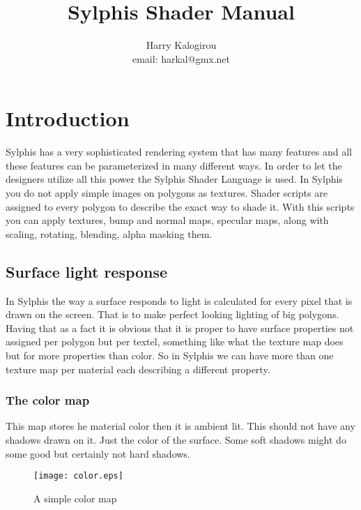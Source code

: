 \documentclass[12pt, titlepage]{amsart}
\begin{document}
\title{Sylphis Shader Manual}
\author{Harry Kalogirou \\
email: harkal@gmx.net}
\maketitle
\tableofcontents
\pagebreak


\section{Introduction}
Sylphis has a very sophisticated rendering system that has many features
and all these features can be parameterized in many different ways. In
order to let the designers utilize all this power the Sylphis Shader
Language is used. In Sylphis you do not apply simple images on polygons
as textures. Shader scripts are assigned to every polygon to describe
the exact way to shade it. With this scripts you can apply textures,
bump and normal maps, specular maps, along with scaling, rotating,
blending, alpha masking them.

\subsection{Surface light response}
In Sylphis the way a surface responds to light is calculated for every pixel
that is drawn on the screen. That is to make perfect looking lighting of big
polygons. Having that as a fact it is obvious that it is proper to have surface
properties not assigned per polygon but per textel, something like what the texture map
does but for more properties than color. So in Sylphis we can have more than one
texture map per material each describing a different property.

\subsubsection{The color map}
This map stores he material color then it is ambient lit. This should not
have any shadows drawn on it. Just the color of the surface. Some soft shadows
might do some good but certainly not hard shadows.

\begin{figure}
\begin{center}
\texttt{[image: color.eps]} \\
\end{center}
\caption{A simple color map}
\label{figure:colormap}
\end{figure}
\end{document}
